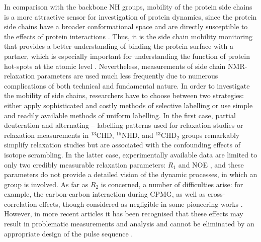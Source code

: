 \documentclass[twocolumn]{svjour3}           %
\begin{document}
In comparison with the backbone NH groups, mobility of the protein side 
chains is a more attractive sensor for investigation of protein dynamics, 
since the protein side chains have a broader conformational space and are 
directly susceptible to the effects of protein interactions 
\cite{igumenova_characterization_2006,paquin_multiple-timescale_2008,trbovic_protein_2009,yang_probing_2011,weininger_13c_2012,ferrage_chapter_2017}. 
Thus, it is the side chain mobility 
monitoring that provides a better understanding of binding the 
protein surface with a partner, which is especially important 
for understanding the function of protein hot-spots at the atomic level 
\cite{zerbe_relationship_2012,cukuroglu_hot_2014,watkins_side-chain_2016}. 
Nevertheless, measurements of side chain NMR-relaxation parameters are used 
much less frequently due to numerous complications of both technical and 
fundamental nature. In order to investigate the mobility of side chains, 
researchers have to choose between two strategies: either apply 
sophisticated and costly methods of selective labelling or use simple and 
readily available methods of uniform \nclab{} labelling. In the 
first case, partial deuteration and alternating \clab--\cnolab{} labelling 
patterns used for \dlab{} relaxation studies or \nclab{} relaxation 
measurements \cite{kushlan_proton-detected_1993,lemaster_dynamical_1996} 
in $^{13}\text{CHD}$, $^{15}\text{NHD}$, and $^{13}\text{CHD}_2$ 
groups remarkably simplify \cite{lemaster_nmr_1999} relaxation studies 
but are associated with the confounding effects of isotope scrambling. 
In the latter case, experimentally available data are limited to only 
two credibly measurable 
\nclab{} relaxation parameters: $R_1$ and NOE 
\cite{yang_probing_2011,ferrage_chapter_2017}, 
and these parameters do not provide a detailed vision of the 
dynamic processes, in which an \XHtwo{} group is involved. As far as 
$R_2$ is concerned, a number of difficulties arise: for example, the 
carbon-carbon \oneJcc{} interaction during {CPMG}, as well as 
cross-correlation effects, though considered as negligible in some pioneering works 
\cite{buck_structural_1995}. However, in more recent articles it 
has been recognised that these effects may result in problematic 
measurements and analysis and cannot be eliminated by an 
appropriate design of the pulse sequence
\cite{yang_probing_2011,kumar_cross-correlations_2000}.
\end{document}
